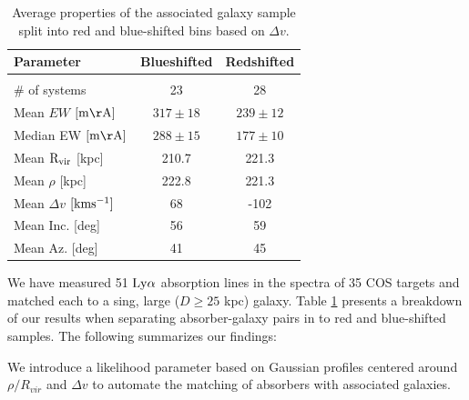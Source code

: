 \documentclass[iop]{emulateapj-rtx4}
\begin{document}
\begin{table}[ht]\footnotesize
\begin{center}
\begin{tabular}{l c c}
 \hline \hline
 Parameter                				&  Blueshifted   &     Redshifted        \\ 
  \hline \hline \\
  
 \# of systems          			 		&     	23				&	28			\\
 Mean $EW$    \scriptsize $\rm [m\AA]$    &	$317 \pm 18$ 		&	$239 \pm 12$  	\\
 Median EW     \scriptsize $\rm [m\AA]$    & 	$288 \pm 15$		& 	$177 \pm 10$	\\
 Mean $\rm R_{vir}$   \scriptsize [kpc]	&   	210.7			& 	221.3   		\\
 Mean $\rho$   \scriptsize [kpc]          		&   	222.8			& 	221.3		\\
 Mean $\Delta v$  \scriptsize $\rm [km s^{-1}]$     &	68				&	-102 			\\
 Mean Inc.  \scriptsize [deg]  			&  	56				&	59			\\
 Mean Az.  \scriptsize [deg]    			&	41				&	45			\\
   
\hline
\end{tabular}
\end{center}
  \caption{\small{Average properties of the associated galaxy sample split into red and blue-shifted bins based on $\Delta v$.}}
  \label{resultsTable}
\end{table}


We have measured 51 $\rm Ly\alpha$ absorption lines in the spectra of 35 COS targets and matched each to a sing, large ($D\geq 25$ kpc) galaxy. Table \ref{resultsTable} presents a breakdown of our results when separating absorber-galaxy pairs in to red and blue-shifted samples. The following summarizes our findings:

\indent \textbullet \indent We introduce a likelihood parameter based on Gaussian profiles centered around $\rho / R_{vir}$ and $\Delta v$ to automate the matching of absorbers with associated galaxies. 

\end{document}
